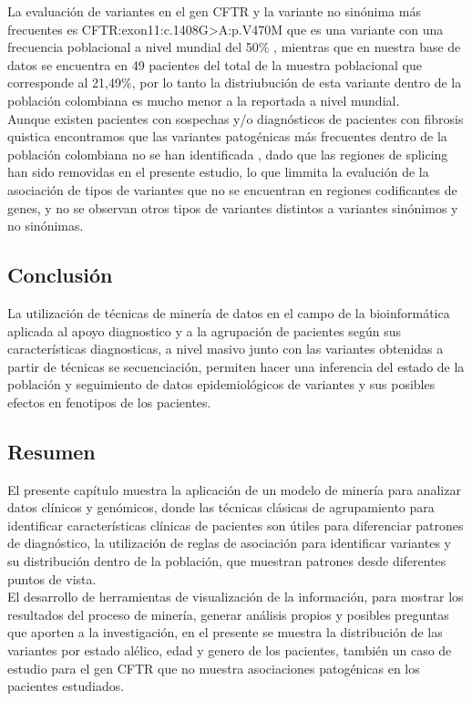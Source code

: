 La evaluación de variantes en el gen CFTR y la variante no sinónima más frecuentes es CFTR:exon11:c.1408G>A:p.V470M que es una variante con una frecuencia poblacional a nivel mundial del 50\% \cite{Zerbino2018}, mientras que en  nuestra base de datos se encuentra en 49 pacientes del total de la muestra poblacional que corresponde al 21,49\%, por lo tanto la distriubución de esta variante dentro de la población colombiana es mucho menor a la reportada a nivel mundial.\\

Aunque existen pacientes con sospechas y/o diagnósticos de pacientes con fibrosis quistica encontramos que las variantes patogénicas más frecuentes dentro de la población colombiana no se han identificada \cite{Vasquez2010}, dado que las regiones de splicing han sido removidas en el presente estudio, lo que limmita la evalución de la asociación de tipos de variantes que no se encuentran en regiones codificantes de genes, y no se observan otros tipos de variantes distintos a variantes sinónimos y no sinónimas. 

\subsection{Conclusión}

La utilización de técnicas de minería de datos en el campo de la bioinformática aplicada al apoyo diagnostico y a la agrupación de pacientes según sus características diagnosticas, a nivel masivo junto con las variantes obtenidas a partir de técnicas se secuenciación, permiten hacer una inferencia del estado de la población y seguimiento de datos epidemiológicos de variantes y sus posibles efectos en fenotipos de los pacientes.

\subsection*{Resumen}

El presente capítulo muestra la aplicación de un modelo de minería para analizar datos clínicos y genómicos, donde las técnicas clásicas de  agrupamiento para identificar características clínicas de pacientes son útiles para diferenciar patrones de diagnóstico, la utilización de reglas de asociación para identificar variantes y su distribución dentro de la población, que muestran patrones desde diferentes puntos de vista.\\

El desarrollo de herramientas de visualización de la información, para mostrar los resultados del proceso de minería, generar análisis propios y posibles preguntas que aporten a la investigación, en el presente se muestra la distribución de las variantes por estado alélico, edad y genero de los pacientes, también un caso de estudio para el gen CFTR que no muestra asociaciones patogénicas en los pacientes estudiados.




   
